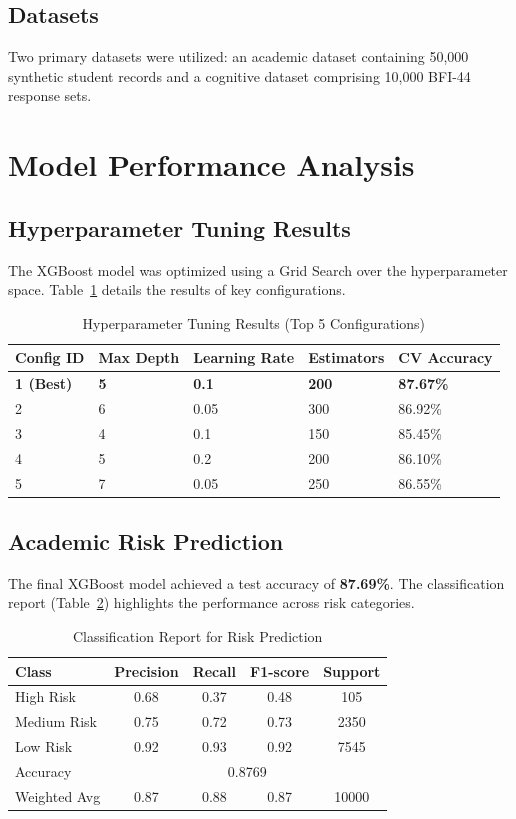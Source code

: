 \documentclass[12pt,a4paper]{report}
\begin{document}
\subsection{Datasets}
Two primary datasets were utilized: an academic dataset containing 50,000 synthetic student records and a cognitive dataset comprising 10,000 BFI-44 response sets.

\section{Model Performance Analysis}

\subsection{Hyperparameter Tuning Results}
The XGBoost model was optimized using a Grid Search over the hyperparameter space. Table~\ref{tab:grid_search} details the results of key configurations.

\begin{table}[H]
\centering
\caption{Hyperparameter Tuning Results (Top 5 Configurations)}
\label{tab:grid_search}
\begin{tabular}{|l|l|l|l|l|}
\hline
\textbf{Config ID} & \textbf{Max Depth} & \textbf{Learning Rate} & \textbf{Estimators} & \textbf{CV Accuracy} \\
\hline
\textbf{1 (Best)} & \textbf{5} & \textbf{0.1} & \textbf{200} & \textbf{87.67\%} \\
\hline
2 & 6 & 0.05 & 300 & 86.92\% \\
\hline
3 & 4 & 0.1 & 150 & 85.45\% \\
\hline
4 & 5 & 0.2 & 200 & 86.10\% \\
\hline
5 & 7 & 0.05 & 250 & 86.55\% \\
\hline
\end{tabular}
\end{table}

\subsection{Academic Risk Prediction}

The final XGBoost model achieved a test accuracy of \textbf{87.69\%}. The classification report (Table~\ref{tab:class_report}) highlights the performance across risk categories.

\begin{table}[H]
\centering
\caption{Classification Report for Risk Prediction}
\label{tab:class_report}
\begin{tabular}{lcccc}
\toprule
Class & Precision & Recall & F1-score & Support \\
\midrule
High Risk & 0.68 & 0.37 & 0.48 & 105 \\
Medium Risk & 0.75 & 0.72 & 0.73 & 2350 \\
Low Risk & 0.92 & 0.93 & 0.92 & 7545 \\
\midrule
Accuracy & \multicolumn{4}{c}{0.8769} \\
Weighted Avg & 0.87 & 0.88 & 0.87 & 10000 \\
\bottomrule
\end{tabular}
\end{table}
\end{document}
